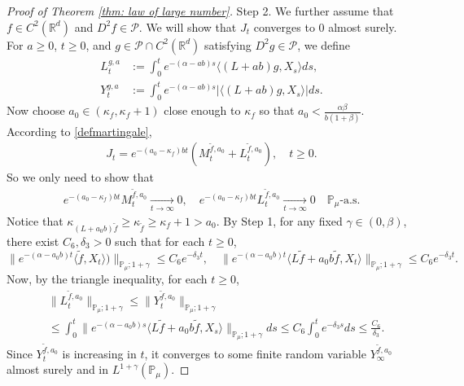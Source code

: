 \documentclass[12pt,a4paper]{amsart}
\theoremstyle{plain}
\theoremstyle{definition}
\numberwithin{equation}{section}
\begin{document}
\begin{proof}[Proof of Theorem \ref{thm: law of large number}]
Step 2.
We further assume that $f\in C^2(\mathbb R^d)$ and $D^2f \in \mathcal{P}$.
We will show that $J_t$ converges to $0$ almost surely.
For $a \geq 0$, $ t\geq 0$, and $g\in \mathcal{P}\cap C^2(\mathbb{R}^d)$ satisfying $D^2g\in \mathcal{P}$, we define
\begin{align}
	L_t^{g,a}
  & :=\int_0^t e^{-(\alpha-ab)s}\langle (L+ab)g,X_s\rangle ds,\\
  Y_t^{g,a}
  & :=\int_0^t e^{-(\alpha-ab)s}|\langle (L+ab)g,X_s\rangle|ds.
\end{align}
Now choose $a_0 \in (\kappa_{f}, \kappa_f + 1)$ close enough to $\kappa_f$ so that $a_0 < \frac{\alpha \beta}{b(1+\beta)}$.
According to \eqref{defmartingale}, 
\begin{align}
  J_t
  = e^{-(a_0-\kappa_f)bt} (M_t^{\widetilde{f}, a_0}+L_t^{\widetilde{f}, a_0}),
  \quad t\geq 0.
\end{align}
So we only need to show that
\begin{align}
  e^{-(a_0-\kappa_f)b t}M_t^{\widetilde{f},a_0}
  \xrightarrow[t\to \infty]{} 0,
  \quad e^{-(a_0-\kappa_f)b t}L_t^{\widetilde{f},a_0}
  \xrightarrow[t\to \infty]{} 0
  \quad \mathbb{P}_{\mu}\text{-a.s.}
\end{align}
Notice that $\kappa_{(L+a_0 b)\widetilde{f}}\geq \kappa_{\widetilde{f}}\geq \kappa_f+1 > a_0$.
By Step 1, for any fixed $\gamma\in (0,\beta)$, there exist $C_6, \delta_3>0$ such that for each $t\geq 0$,
\begin{equation}
  \| e^{-(\alpha-a_0 b)t}\langle \widetilde{f},X_t\rangle)\|_{\mathbb{P}_{\mu};1+\gamma}
  \leq C_6 e^{-\delta_3 t},
  \quad \|e^{-(\alpha-a_0 b)t}\langle L\widetilde{f}+a_0 b\widetilde{f},X_t\rangle\|_{\mathbb{P}_{\mu};1+\gamma}
  \leq C_6 e^{-\delta_3 t}.
\end{equation}
Now, by the triangle inequality, for each $t\geq 0$,
\begin{align}
  & \|L_t^{\widetilde{f},a_0}\|_{\mathbb{P}_{\mu};1+\gamma}
    \leq\|Y_t^{\widetilde{f},a_0}\|_{\mathbb{P}_{\mu};1+\gamma} \\
  & \leq \int_0^t \|e^{-(\alpha-a_0 b)s}\langle L\widetilde{f}+a_0 b\widetilde{f},X_s\rangle\|_{\mathbb{P}_{\mu};1+\gamma}ds\leq C_6 \int_0^t e^{-\delta_3 s}ds\leq\frac{C_6}{\delta_3}.
\end{align}
Since $Y_t^{\widetilde{f},a_0}$ is increasing in $t$, it converges to some finite random variable $Y_{\infty}^{\widetilde{f},a_0}$ almost surely and in $L^{1+\gamma}(\mathbb{P}_{\mu})$.

\end{proof}
\end{document}
